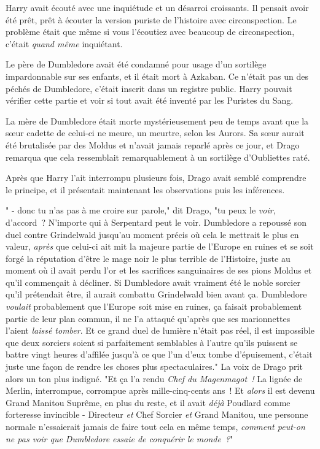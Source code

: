 \later

Harry avait écouté avec une inquiétude et un désarroi croissants. Il pensait avoir été prêt, prêt à écouter la version puriste de l'histoire avec circonspection. Le problème était que même si vous l'écoutiez avec beaucoup de circonspection, c'était \emph{quand même} inquiétant.

Le père de Dumbledore avait été condamné pour usage d'un sortilège impardonnable sur ses enfants, et il était mort à Azkaban. Ce n'était pas un des péchés de Dumbledore, c'était inscrit dans un registre public. Harry pouvait vérifier cette partie et voir si tout avait été inventé par les Puristes du Sang.

La mère de Dumbledore était morte mystérieusement peu de temps avant que la sœur cadette de celui-ci ne meure, un meurtre, selon les Aurors. Sa sœur aurait été brutalisée par des Moldus et n'avait jamais reparlé après ce jour, et Drago remarqua que cela ressemblait remarquablement à un sortilège d'Oubliettes raté.

Après que Harry l'ait interrompu plusieurs fois, Drago avait semblé comprendre le principe, et il présentait maintenant les observations puis les inférences.

" - donc tu n'as pas à me croire sur parole," dit Drago, "tu peux le \emph{voir}, d'accord~? N'importe qui à Serpentard peut le voir. Dumbledore a repoussé son duel contre Grindelwald jusqu'au moment précis où cela le mettrait le plus en valeur, \emph{après} que celui-ci ait mit la majeure partie de l'Europe en ruines et se soit forgé la réputation d'être le mage noir le plus terrible de l'Histoire, juste au moment où il avait perdu l'or et les sacrifices sanguinaires de ses pions Moldus et qu'il commençait à décliner. Si Dumbledore avait vraiment été le noble sorcier qu'il prétendait être, il aurait combattu Grindelwald bien avant ça. Dumbledore \emph{voulait} probablement que l'Europe soit mise en ruines, ça faisait probablement partie de leur plan commun, il ne l'a attaqué qu'après que ses marionnettes l'aient \emph{laissé tomber}. Et ce grand duel de lumière n'était pas réel, il est impossible que deux sorciers soient si parfaitement semblables à l'autre qu'ils puissent se battre vingt heures d'affilée jusqu'à ce que l'un d'eux tombe d'épuisement, c'était juste une façon de rendre les choses plus spectaculaires." La voix de Drago prit alors un ton plus indigné. "Et ça l'a rendu \emph{Chef du Magenmagot~!} La lignée de Merlin, interrompue, corrompue après mille-cinq-cents ans~! Et \emph{alors} il est devenu Grand Manitou Suprême, en plus du reste, et il avait \emph{déjà} Poudlard comme forteresse invincible - Directeur \emph{et} Chef Sorcier \emph{et} Grand Manitou, une personne normale n'essaierait jamais de faire tout cela en même temps, \emph{comment peut-on ne pas voir que Dumbledore essaie de conquérir le monde~?}"

